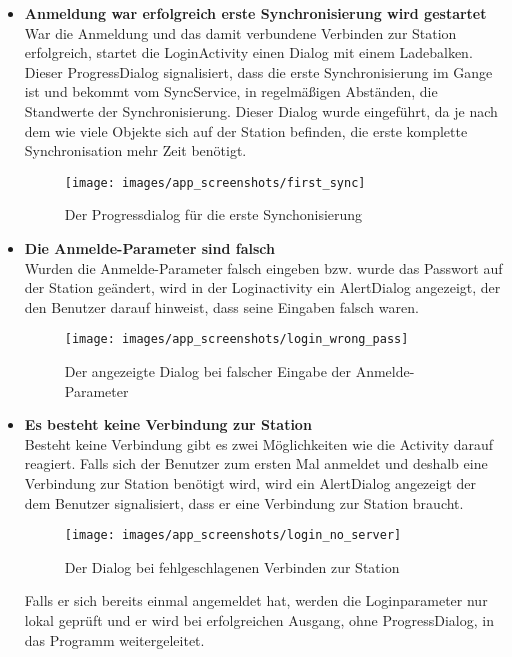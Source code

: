 \begin{itemize}

\item{\textbf {Anmeldung war erfolgreich erste Synchronisierung wird gestartet}}\\
War die Anmeldung und das damit verbundene Verbinden zur Station erfolgreich, startet die LoginActivity einen Dialog mit einem Ladebalken. Dieser ProgressDialog signalisiert, dass die erste Synchronisierung im Gange ist und bekommt vom SyncService, in regelmäßigen Abständen, die Standwerte der Synchronisierung. Dieser Dialog wurde eingeführt, da je nach dem wie viele Objekte sich auf der Station befinden, die erste komplette Synchronisation mehr Zeit benötigt. 

\begin{figure}[H]
\centering
\texttt{[image: images/app\_screenshots/first\_sync]}
\caption{Der Progressdialog für die erste Synchonisierung}
\end{figure}

\item{\textbf {Die Anmelde-Parameter sind falsch}}\\
Wurden die Anmelde-Parameter falsch eingeben bzw. wurde das Passwort auf der Station geändert, wird in der Loginactivity ein AlertDialog angezeigt, der den Benutzer darauf hinweist, dass seine Eingaben falsch waren.

\begin{figure}[H]
\centering
\texttt{[image: images/app\_screenshots/login\_wrong\_pass]}
\caption{Der angezeigte Dialog bei falscher Eingabe der Anmelde-Parameter}
\end{figure}
\item{\textbf {Es besteht keine Verbindung zur Station}}\\
Besteht keine Verbindung gibt es zwei Möglichkeiten wie die Activity darauf reagiert. Falls sich der Benutzer zum ersten Mal anmeldet und deshalb eine Verbindung zur Station benötigt wird, wird ein AlertDialog angezeigt der dem Benutzer signalisiert, dass er eine Verbindung zur Station braucht.

\begin{figure}[H]
\centering
\texttt{[image: images/app\_screenshots/login\_no\_server]}
\caption{Der Dialog bei fehlgeschlagenen Verbinden zur Station}
\end{figure}

Falls er sich bereits einmal angemeldet hat, werden  die Loginparameter nur lokal geprüft und er wird bei erfolgreichen Ausgang, ohne ProgressDialog, in das Programm weitergeleitet.

\end{itemize}



